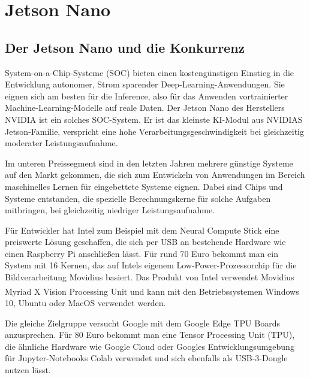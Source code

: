 %
%
%



\chapter{Jetson Nano}

\section{Der Jetson Nano und die Konkurrenz}

System-on-a-Chip-Systeme (SOC) bieten einen kostengünstigen Einstieg 
in die Ent­wicklung autonomer, Strom sparender Deep-Learning-Anwendungen. 
Sie eignen sich am besten für die Inference, also für das Anwenden 
vortrainierter Machine-Learning-Modelle auf reale Daten. 
Der Jetson Nano des Herstellers NVIDIA ist ein solches SOC-System. Er 
ist das kleinste KI-Modul aus NVIDIAS Jetson-Familie, verspricht eine 
hohe Verarbeitungsgeschwindigkeit bei gleichzeitig moderater Leistungsaufnahme.
\cite{JetsonGettingStarted:2019}



\bigskip

Im unteren Preissegment sind in den letzten Jahren mehrere günstige Systeme auf den 
Markt gekommen, die sich zum Entwickeln von Anwendungen im Bereich maschinelles 
Lernen für eingebettete Systeme eignen. Dabei sind Chips und Systeme entstanden, 
die spezielle Berechnungskerne für solche Aufgaben mitbringen, bei gleichzeitig 
niedriger Leistungsaufnahme.

Für Entwickler hat Intel zum Beispiel mit dem Neural Compute Stick eine preiswerte 
Lösung geschaffen, die sich per USB an bestehende Hardware wie einen Raspberry Pi 
anschließen lässt. Für rund 70 Euro bekommt man ein System mit 16 Kernen, das auf 
Intels eigenem Low-Power-Prozessorchip für die Bildverarbeitung Movidius basiert. 
Das Produkt von Intel verwendet 
 Movidius Myriad X Vision Processing Unit und kann mit den Betriebssystemen  
 Windows\textsuperscript{\textregistered} 10, Ubuntu oder 
 MacOS verwendet werden. \cite{IntelStickDataSheet:2019}


\bigskip

Die gleiche Zielgruppe versucht Google mit dem Google Edge TPU Boards anzusprechen. 
Für 80 Euro bekommt man eine Tensor Processing Unit (TPU), die ähnliche Hardware 
wie Google Cloud oder Googles Entwicklungsumgebung für Jupyter-Notebooks Colab 
verwendet und sich ebenfalls als USB-3-Dongle nutzen lässt.
\cite{Vincent:2018,GoogleTensorFlowModel:2019,GoogleCoral:2019} 



